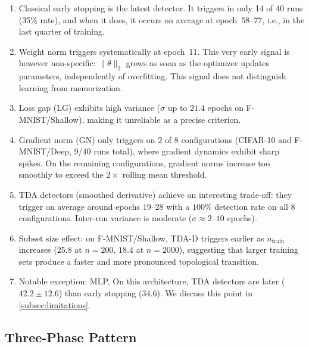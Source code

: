 \documentclass[11pt,a4paper]{article}
\newcommand{\ecart}{\pm}
\begin{document}
\begin{enumerate}
  \item Classical early stopping is the latest detector. It
  triggers in only 14 of 40 runs (35\% rate), and when it does, it
  occurs on average at epoch~$58$--$77$, i.e., in the last quarter
  of training.

  \item Weight norm triggers systematically at epoch~11. This
  very early signal is however non-specific: $\|\theta\|_2$ grows
  as soon as the optimizer updates parameters, independently of overfitting.
  This signal does not distinguish learning from memorization.

  \item Loss gap (LG) exhibits high variance ($\sigma$ up to
  $21.4$ epochs on F-MNIST/Shallow), making it unreliable as a precise
  criterion.

  \item Gradient norm (GN) only triggers on 2 of 8 configurations
  (CIFAR-10 and F-MNIST/Deep, 9/40 runs total), where gradient dynamics
  exhibit sharp spikes. On the remaining configurations, gradient norms
  increase too smoothly to exceed the $2\times$ rolling mean threshold.

  \item TDA detectors (smoothed derivative) achieve an interesting
  trade-off: they trigger on average around epochs 19--28 with a $100\%$
  detection rate on all 8 configurations. Inter-run variance is moderate
  ($\sigma \approx 2$--$10$ epochs).

  \item Subset size effect: on F-MNIST/Shallow, TDA-D triggers
  earlier as $n_{\mathrm{train}}$ increases ($25.8$ at $n\!=\!200$,
  $18.4$ at $n\!=\!2000$), suggesting that larger training sets produce
  a faster and more pronounced topological transition.

  \item Notable exception: MLP. On this architecture, TDA detectors
  are later ($42.2 \ecart 12.6$) than early stopping ($34.6$). We discuss
  this point in \cref{subsec:limitations}.
\end{enumerate}

\subsection{Three-Phase Pattern}
\label{subsec:trois_phases}
\end{document}
